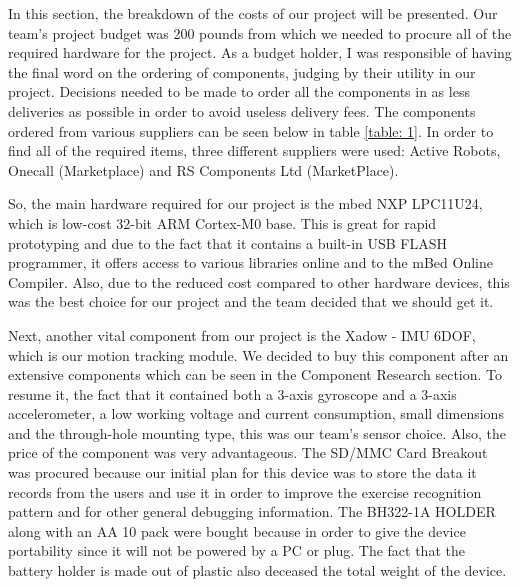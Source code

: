 In this section, the breakdown of the costs of our project will be presented. Our team's project budget was 200 pounds from which we needed to procure all of the required hardware for the project. As a budget holder, I was responsible of having the final word on the ordering of components, judging by their utility in our project. Decisions needed to be made to order all the components in as less deliveries as possible in order to avoid useless delivery fees. The components ordered from various suppliers can be seen below in table \ref{table: 1}. In order to find all of the required items, three different suppliers were used: Active Robots, Onecall (Marketplace) and RS Components Ltd (MarketPlace).

So, the main hardware required for our project is the mbed NXP LPC11U24, which is low-cost 32-bit ARM Cortex-M0 base. This is great for rapid prototyping and due to the fact that it contains a built-in USB FLASH programmer, it offers access to various libraries online and to the mBed Online Compiler. Also, due to the  reduced cost compared to other hardware devices, this was the best choice for our project and the team decided that we should get it. 

Next, another vital component from our project is the Xadow - IMU 6DOF, which is our motion tracking module. We decided to buy this component after an extensive components which can be seen in the Component Research section. To resume it, the fact that it contained both a 3-axis gyroscope and a 3-axis accelerometer, a low working voltage and current consumption, small dimensions and the through-hole mounting type, this was our team's sensor choice. Also, the price of the component was very advantageous. The SD/MMC Card Breakout was procured because our initial plan for this device was to store the data it records from the users and use it in order to improve the exercise recognition pattern and for other general debugging information. The BH322-1A  HOLDER along with an AA 10 pack were bought because in order to give the device portability since it will not be powered by a PC or plug. The fact that the battery holder is made out of plastic also deceased the total weight of the device.

